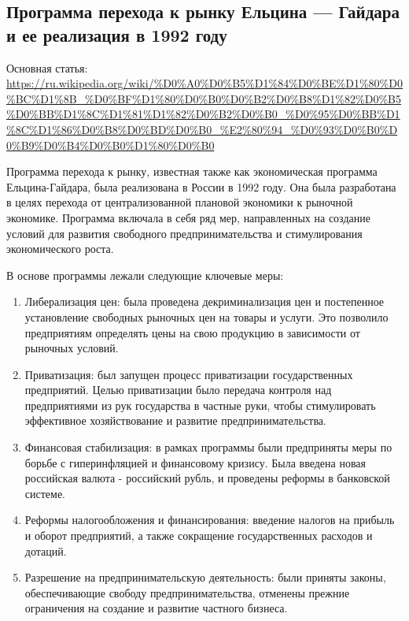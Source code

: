 \documentclass{article}
\begin{document}
\pagebreak
\subsection{Программа перехода к рынку Ельцина — Гайдара и ее реализация в 1992 году}

Основная статья: \url{https://ru.wikipedia.org/wiki/%D0%A0%D0%B5%D1%84%D0%BE%D1%80%D0%BC%D1%8B_%D0%BF%D1%80%D0%B0%D0%B2%D0%B8%D1%82%D0%B5%D0%BB%D1%8C%D1%81%D1%82%D0%B2%D0%B0_%D0%95%D0%BB%D1%8C%D1%86%D0%B8%D0%BD%D0%B0_%E2%80%94_%D0%93%D0%B0%D0%B9%D0%B4%D0%B0%D1%80%D0%B0}

\hfill

Программа перехода к рынку, известная также как экономическая программа Ельцина-Гайдара, была реализована в России в 1992 году. Она была разработана в целях перехода от централизованной плановой экономики к рыночной экономике. Программа включала в себя ряд мер, направленных на создание условий для развития свободного предпринимательства и стимулирования экономического роста.

\hfill

В основе программы лежали следующие ключевые меры:

\begin{enumerate}
    \item Либерализация цен: была проведена декриминализация цен и постепенное установление свободных рыночных цен на товары и услуги. Это позволило предприятиям определять цены на свою продукцию в зависимости от рыночных условий.
    \item Приватизация: был запущен процесс приватизации государственных предприятий. Целью приватизации было передача контроля над предприятиями из рук государства в частные руки, чтобы стимулировать эффективное хозяйствование и развитие предпринимательства.
    \item Финансовая стабилизация: в рамках программы были предприняты меры по борьбе с гиперинфляцией и финансовому кризису. Была введена новая российская валюта - российский рубль, и проведены реформы в банковской системе.
    \item Реформы налогообложения и финансирования: введение налогов на прибыль и оборот предприятий, а также сокращение государственных расходов и дотаций.
    \item Разрешение на предпринимательскую деятельность: были приняты законы, обеспечивающие свободу предпринимательства, отменены прежние ограничения на создание и развитие частного бизнеса.
\end{enumerate}
\end{document}
